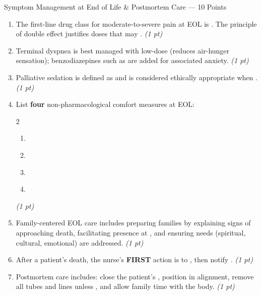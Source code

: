 \documentclass[11pt,letterpaper]{article}
\newcommand{\blank}[1][3cm]{\underline{\hspace{#1}}}
\begin{document}
\begin{diagbox}{Symptom Management at End of Life \& Postmortem Care --- 10 Points}

\begin{enumerate}[leftmargin=1.5em, label=\textbf{\arabic*.},start=161]

  \item The first-line drug class for moderate-to-severe pain at EOL is
        \blank[3cm].  The principle of double effect justifies doses that
        may \blank[5cm].
        \hfill\textit{(1 pt)}

  \item Terminal dyspnea is best managed with low-dose \blank[3cm]
        (reduces air-hunger sensation); benzodiazepines such as \blank[3cm]
        are added for associated anxiety.
        \hfill\textit{(1 pt)}

  \item Palliative sedation is defined as \blank[6cm] and is considered
        ethically appropriate when \blank[5cm].
        \hfill\textit{(1 pt)}

  \item List \textbf{four} non-pharmacological comfort measures at EOL:
        \begin{multicols}{2}
        \begin{enumerate}[label=\arabic*.]
          \item \blank[4cm]
          \item \blank[4cm]
          \item \blank[4cm]
          \item \blank[4cm]
        \end{enumerate}
        \end{multicols}
        \hfill\textit{(1 pt)}

  \item Family-centered EOL care includes preparing families by explaining signs
        of approaching death, facilitating presence at \blank[3cm], and
        ensuring \blank[3cm] needs (spiritual, cultural, emotional) are addressed.
        \hfill\textit{(1 pt)}

  \item After a patient's death, the nurse's \textbf{FIRST} action is to
        \blank[4cm], then notify \blank[3cm].
        \hfill\textit{(1 pt)}

  \item Postmortem care includes: close the patient's \blank[2cm], position
        in \blank[3cm] alignment, remove all tubes and lines unless
        \blank[4cm], and allow family \blank[4cm] time with the body.
        \hfill\textit{(1 pt)}


\end{enumerate}
\end{diagbox}
\end{document}
